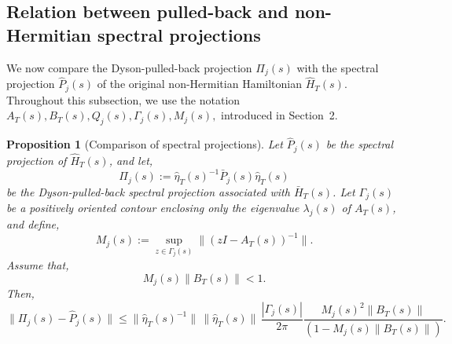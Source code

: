 \documentclass[pdflatex,sn-mathphys-num]{sn-jnl}
\theoremstyle{thmstyleone}
\newtheorem{proposition}[theorem]{Proposition}
\theoremstyle{thmstyletwo}
\theoremstyle{thmstylethree}
\begin{document}
\subsection{Relation between pulled-back and non-Hermitian spectral projections}

We now compare the Dyson-pulled-back projection \(\Pi_j(s)\) with the spectral
projection \(\hat P_j(s)\) of the original non-Hermitian Hamiltonian \(\hat H_T(s)\).
Throughout this subsection, we use the notation
\(
A_T(s),B_T(s), Q_j(s), \Gamma_j(s), M_j(s),
\)
introduced in Section~2.

\begin{proposition}[Comparison of spectral projections]
\label{prop:ProjectionComparison}
Let \(\hat P_j(s)\) be the spectral projection of \(\hat H_T(s)\), and let,
\[
\Pi_j(s):=\hat\eta_T(s)^{-1}\bar P_j(s)\hat\eta_T(s)
\]
be the Dyson-pulled-back spectral projection associated with \(\bar H_T(s)\).
Let \(\Gamma_j(s)\) be a positively oriented contour enclosing only the eigenvalue
\(\lambda_j(s)\) of \(A_T(s)\), and define,
\[
M_j(s):=\sup_{z\in\Gamma_j(s)}\|(zI-A_T(s))^{-1}\|.
\]
Assume that,
\[
M_j(s)\|B_T(s)\|<1.
\]
Then,
\[
\|\Pi_j(s)-\hat P_j(s)\|
\le
\|\hat\eta_T(s)^{-1}\|\,\|\hat\eta_T(s)\|\,
\frac{|\Gamma_j(s)|}{2\pi}
\frac{M_j(s)^2\|B_T(s)\|}
{(1-M_j(s)\|B_T(s)\|)}.
\]
\end{proposition}
\end{document}
